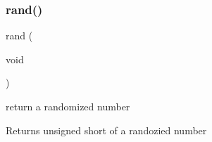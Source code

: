\subsubsection{\texorpdfstring{rand()}{rand()}}
{\footnotesize\ttfamily rand (\begin{DoxyParamCaption}\item[{void}]{ }\end{DoxyParamCaption})}



return a randomized number 

\begin{DoxyReturn}{Returns}
unsigned short of a randozied number 
\end{DoxyReturn}
